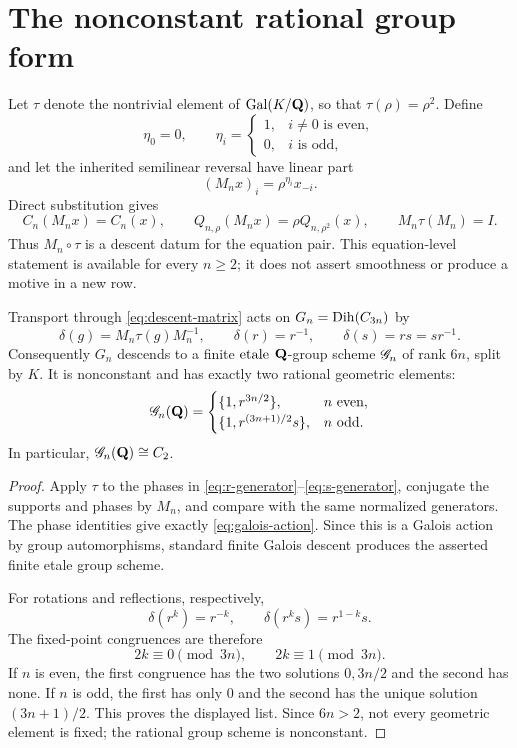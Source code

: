 \section{The nonconstant rational group form}
\label{sec:rational-form}

Let \(\tau\) denote the nontrivial element of
\(\operatorname{Gal}(K/\mathbf Q)\), so that \(\tau(\rho)=\rho^2\).  Define
\[
\eta_0=0,\qquad
\eta_i=
\begin{cases}
1,&i\ne0\text{ is even},\\
0,&i\text{ is odd},
\end{cases}
\]
and let the inherited semilinear reversal have linear part
\begin{equation}
(M_nx)_i=\rho^{\eta_i}x_{-i}.
\label{eq:descent-matrix}
\end{equation}
Direct substitution gives
\begin{equation}
C_n(M_nx)=C_n(x),\qquad
Q_{n,\rho}(M_nx)=\rho Q_{n,\rho^2}(x),\qquad
M_n\tau(M_n)=I.
\label{eq:descent-identities}
\end{equation}
Thus \(M_n\circ\tau\) is a descent datum for the equation pair.  This
equation-level statement is available for every \(n\ge2\); it does not
assert smoothness or produce a motive in a new row.

\begin{theorem}
\label{thm:rational-form}
Transport through \eqref{eq:descent-matrix} acts on
\(G_n=\operatorname{Dih}(C_{3n})\) by
\begin{equation}
\delta(g)=M_n\tau(g)M_n^{-1},\qquad
\delta(r)=r^{-1},\qquad
\delta(s)=rs=sr^{-1}.
\label{eq:galois-action}
\end{equation}
Consequently \(G_n\) descends to a finite \({\rm etale}\)
\(\mathbf Q\)-group scheme \(\mathscr G_n\) of rank \(6n\), split by \(K\).
It is nonconstant and has exactly two rational geometric elements:
\[
\mathscr G_n(\mathbf Q)=
\begin{cases}
\{1,r^{3n/2}\},&n\text{ even},\\
\{1,r^{(3n+1)/2}s\},&n\text{ odd}.
\end{cases}
\]
In particular, \(\mathscr G_n(\mathbf Q)\cong C_2\).
\end{theorem}

\begin{proof}
Apply \(\tau\) to the phases in
\eqref{eq:r-generator}--\eqref{eq:s-generator}, conjugate the supports and
phases by \(M_n\), and compare with the same normalized generators.  The
phase identities give exactly \eqref{eq:galois-action}.  Since this is a
Galois action by group automorphisms, standard finite Galois descent produces
the asserted finite etale group scheme.

For rotations and reflections, respectively,
\[
\delta(r^k)=r^{-k},\qquad
\delta(r^ks)=r^{1-k}s.
\]
The fixed-point congruences are therefore
\[
2k\equiv0\pmod{3n},\qquad
2k\equiv1\pmod{3n}.
\]
If \(n\) is even, the first congruence has the two solutions
\(0,3n/2\) and the second has none.  If \(n\) is odd, the first has only
\(0\) and the second has the unique solution \((3n+1)/2\).  This proves
the displayed list.  Since \(6n>2\), not every geometric element is fixed;
the rational group scheme is nonconstant.
\end{proof}

